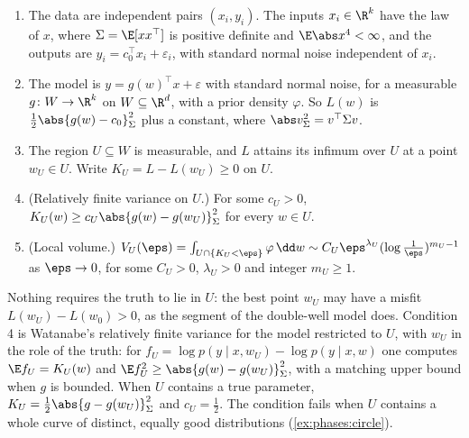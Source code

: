\begin{refsection}
\begin{assumption}\label{ass:phases:region}
\leavevmode
\begin{enumerate}
\item The data are independent pairs $(x_i,y_i)$. The inputs $x_i\in\R^k$ have the law of $x$, where $\Sigma=\E[xx^\top]$ is positive definite and $\E\abs x^4<\infty$, and the outputs are $y_i=c_0^\top x_i+\varepsilon_i$, with standard normal noise independent of $x_i$.
\item The model is $y=g(w)^\top x+\varepsilon$ with standard normal noise, for a measurable $g\colon W\to\R^k$ on $W\subseteq\R^d$, with a prior density $\varphi$. So $L(w)$ is $\frac12\abs{g(w)-c_0}_\Sigma^2$ plus a constant, where $\abs v_\Sigma^2=v^\top\Sigma v$.
\item The region $U\subseteq W$ is measurable, and $L$ attains its infimum over $U$ at a point $w_U\in U$. Write $K_U=L-L(w_U)\ge0$ on $U$.
\item (Relatively finite variance on $U$.) For some $c_U>0$, $K_U(w)\ge c_U\abs{g(w)-g(w_U)}_\Sigma^2$ for every $w\in U$.
\item (Local volume.) $V_U(\eps)=\int_{U\cap\{K_U<\eps\}}\varphi\,\dd w\sim C_U\eps^{\lambda_U}(\log\frac1\eps)^{m_U-1}$ as $\eps\to0$, for some $C_U>0$, $\lambda_U>0$ and integer $m_U\ge1$.
\end{enumerate}
\end{assumption}

Nothing requires the truth to lie in $U$: the best point $w_U$ may have a misfit $L(w_U)-L(w_0)>0$, as the segment of the double-well model does. Condition 4 is Watanabe's relatively finite variance for the model restricted to $U$, with $w_U$ in the role of the truth: for $f_U=\log p(y\mid x,w_U)-\log p(y\mid x,w)$ one computes $\E f_U=K_U(w)$ and $\E f_U^2\ge\abs{g(w)-g(w_U)}_\Sigma^2$, with a matching upper bound when $g$ is bounded. When $U$ contains a true parameter, $K_U=\frac12\abs{g-g(w_U)}_\Sigma^2$ and $c_U=\frac12$. The condition fails when $U$ contains a whole curve of distinct, equally good distributions (\cref{ex:phases:circle}).


\end{refsection}
